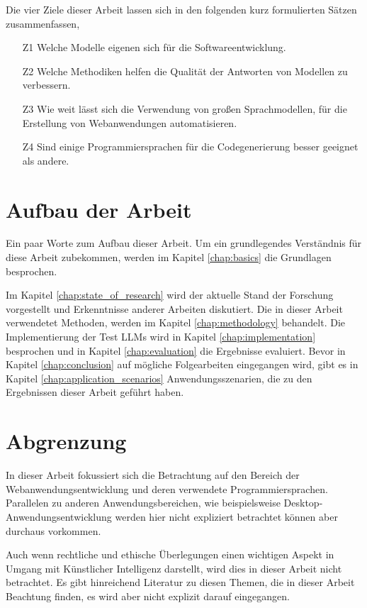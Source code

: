 Die vier Ziele dieser Arbeit lassen sich in den folgenden kurz formulierten Sätzen zusammenfassen,

\begin{itemize}
	\item[Z1] Welche Modelle eigenen sich für die Softwareentwicklung.
	\item[Z2] Welche Methodiken helfen die Qualität der Antworten von Modellen zu verbessern.
	\item[Z3] Wie weit lässt sich die Verwendung von großen Sprachmodellen, für die Erstellung von Webanwendungen automatisieren.
	\item[Z4] Sind einige Programmiersprachen für die Codegenerierung besser geeignet als andere.
\end{itemize}


\section{Aufbau der Arbeit}
Ein paar Worte zum Aufbau dieser Arbeit. Um ein grundlegendes Verständnis für diese Arbeit zubekommen, werden im Kapitel \ref{chap:basics} die Grundlagen besprochen.\vspace{0.2cm}

Im Kapitel \ref{chap:state_of_research} wird der aktuelle Stand der Forschung vorgestellt und Erkenntnisse anderer Arbeiten diskutiert. Die in dieser Arbeit verwendetet Methoden, werden im Kapitel \ref{chap:methodology} behandelt. Die Implementierung der Test LLMs wird in Kapitel \ref{chap:implementation} besprochen und in Kapitel \ref{chap:evaluation} die Ergebnisse evaluiert. Bevor in Kapitel \ref{chap:conclusion} auf mögliche Folgearbeiten eingegangen wird, gibt es in Kapitel \ref{chap:application_scenarios} Anwendungsszenarien, die zu den Ergebnissen dieser Arbeit geführt haben.


\section{Abgrenzung}
In dieser Arbeit fokussiert sich die Betrachtung auf den Bereich der Webanwendungsentwicklung und deren verwendete Programmiersprachen. Parallelen zu anderen Anwendungsbereichen, wie beispielsweise Desktop-Anwendungsentwicklung werden hier nicht expliziert betrachtet können aber durchaus vorkommen.\vspace{0.2cm}

Auch wenn rechtliche und ethische Überlegungen einen wichtigen Aspekt in Umgang mit Künstlicher Intelligenz darstellt, wird dies in dieser Arbeit nicht betrachtet. Es gibt hinreichend Literatur zu diesen Themen, die in dieser Arbeit Beachtung finden, es wird aber nicht explizit darauf eingegangen.
